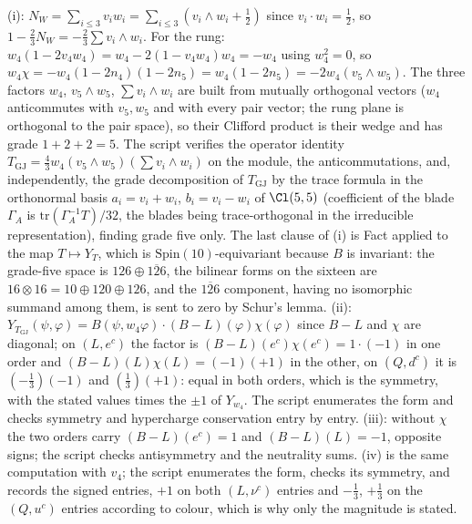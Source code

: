(i): $N_{W} = \sum_{i\le3} v_{i}w_{i} = \sum_{i\le3}(v_{i}\wedge w_{i} + \tfrac12)$ since $v_{i}\cdot w_{i} = \tfrac12$, so $1 - \tfrac23 N_{W} = -\tfrac23\sum v_{i}\wedge w_{i}$. For the rung: $w_{4}(1 - 2v_{4}w_{4}) = w_{4} - 2(1 - v_{4}w_{4})w_{4} = -w_{4}$ using $w_{4}^{2} = 0$, so $w_{4}\chi = -w_{4}(1 - 2n_{4})(1 - 2n_{5}) = w_{4}(1 - 2n_{5}) = -2w_{4}(v_{5}\wedge w_{5})$. The three factors $w_{4}$, $v_{5}\wedge w_{5}$, $\sum v_{i}\wedge w_{i}$ are built from mutually orthogonal vectors ($w_{4}$ anticommutes with $v_{5}, w_{5}$ and with every pair vector; the rung plane is orthogonal to the pair space), so their Clifford product is their wedge and has grade $1 + 2 + 2 = 5$. The script verifies the operator identity $T_{\mathrm{GJ}} = \tfrac43 w_{4}(v_{5}\wedge w_{5})(\sum v_{i}\wedge w_{i})$ on the module, the anticommutations, and, independently, the grade decomposition of $T_{\mathrm{GJ}}$ by the trace formula in the orthonormal basis $a_{i} = v_{i} + w_{i}$, $b_{i} = v_{i} - w_{i}$ of $\Cl(5,5)$ (coefficient of the blade $\Gamma_{A}$ is $\mathrm{tr}(\Gamma_{A}^{-1}T)/32$, the blades being trace-orthogonal in the irreducible representation), finding grade five only. The last clause of (i) is Fact  applied to the map $T \mapsto Y_{T}$, which is $\mathrm{Spin}(10)$-equivariant because $B$ is invariant: the grade-five space is $126 \oplus \overline{126}$, the bilinear forms on the sixteen are $16 \otimes 16 = 10 \oplus 120 \oplus 126$, and the $\overline{126}$ component, having no isomorphic summand among them, is sent to zero by Schur's lemma. (ii): $Y_{T_{\mathrm{GJ}}}(\psi, \varphi) = B(\psi, w_{4}\varphi)\cdot(B - L)(\varphi)\chi(\varphi)$ since $B - L$ and $\chi$ are diagonal; on $(L, e^{c})$ the factor is $(B-L)(e^{c})\chi(e^{c}) = 1\cdot(-1)$ in one order and $(B-L)(L)\chi(L) = (-1)(+1)$ in the other, on $(Q, d^{c})$ it is $(-\tfrac13)(-1)$ and $(\tfrac13)(+1)$: equal in both orders, which is the symmetry, with the stated values times the $\pm1$ of $Y_{w_{4}}$. The script enumerates the form and checks symmetry and hypercharge conservation entry by entry. (iii): without $\chi$ the two orders carry $(B-L)(e^{c}) = 1$ and $(B-L)(L) = -1$, opposite signs; the script checks antisymmetry and the neutrality sums. (iv) is the same computation with $v_{4}$; the script enumerates the form, checks its symmetry, and records the signed entries, $+1$ on both $(L, \nu^{c})$ entries and $-\tfrac13$, $+\tfrac13$ on the $(Q, u^{c})$ entries according to colour, which is why only the magnitude is stated.
